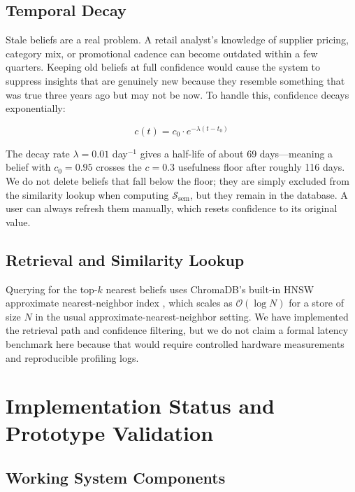 \documentclass[conference]{IEEEtran}
\begin{document}
\subsection{Temporal Decay}

Stale beliefs are a real problem. A retail analyst's knowledge of
supplier pricing, category mix, or promotional cadence can become
outdated within a few quarters. Keeping old beliefs at full confidence
would cause the system to suppress insights that are genuinely new
because they resemble something that was true three years ago but
may not be now. To handle this, confidence decays exponentially:

\begin{equation}
  c(t) = c_0 \cdot e^{-\lambda(t - t_0)}
  \label{eq:decay}
\end{equation}

The decay rate $\lambda = 0.01$ day$^{-1}$ gives a half-life of
about 69 days---meaning a belief with $c_0 = 0.95$ crosses the
$c = 0.3$ usefulness floor after roughly 116 days. We do not
delete beliefs that fall below the floor; they are simply excluded
from the similarity lookup when computing $\mathcal{S}_{\text{sem}}$,
but they remain in the database. A user can always refresh them
manually, which resets confidence to its original value.

\subsection{Retrieval and Similarity Lookup}

Querying for the top-$k$ nearest beliefs uses ChromaDB's built-in
HNSW approximate nearest-neighbor index \cite{malkov2018efficient},
which scales as $\mathcal{O}(\log N)$ for a store of size $N$ in the
usual approximate-nearest-neighbor setting. We have implemented the
retrieval path and confidence filtering, but we do not claim a formal
latency benchmark here because that would require controlled hardware
measurements and reproducible profiling logs.

\section{Implementation Status and Prototype Validation}
\label{sec:eval}

\subsection{Working System Components}
\end{document}
